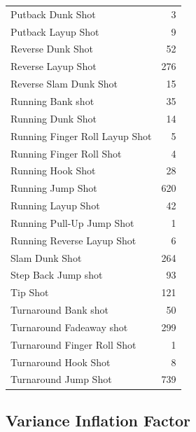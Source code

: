 \documentclass[american,]{article}
\begin{document}
\begin{longtable}{lr}
Putback Dunk Shot & 3\\
\addlinespace
\rowcolor{gray!6}  Putback Layup Shot & 9\\
Reverse Dunk Shot & 52\\
\rowcolor{gray!6}  Reverse Layup Shot & 276\\
Reverse Slam Dunk Shot & 15\\
\rowcolor{gray!6}  Running Bank shot & 35\\
\addlinespace
Running Dunk Shot & 14\\
\rowcolor{gray!6}  Running Finger Roll Layup Shot & 5\\
Running Finger Roll Shot & 4\\
\rowcolor{gray!6}  Running Hook Shot & 28\\
Running Jump Shot & 620\\
\addlinespace
\rowcolor{gray!6}  Running Layup Shot & 42\\
Running Pull-Up Jump Shot & 1\\
\rowcolor{gray!6}  Running Reverse Layup Shot & 6\\
Slam Dunk Shot & 264\\
\rowcolor{gray!6}  Step Back Jump shot & 93\\
\addlinespace
Tip Shot & 121\\
\rowcolor{gray!6}  Turnaround Bank shot & 50\\
Turnaround Fadeaway shot & 299\\
\rowcolor{gray!6}  Turnaround Finger Roll Shot & 1\\
Turnaround Hook Shot & 8\\
\addlinespace
\rowcolor{gray!6}  Turnaround Jump Shot & 739\\*
\end{longtable}
\endgroup{}

\hypertarget{variance-inflation-factor}{%
\subsection{\texorpdfstring{\textbf{Variance Inflation Factor}}{Variance Inflation Factor}}\label{variance-inflation-factor}}
\end{document}
